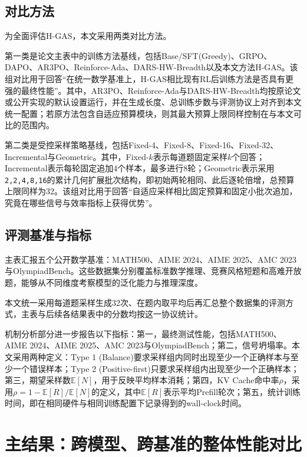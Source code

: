 \subsection{对比方法}
\label{subsec:exp_baselines}

为全面评估H-GAS，本文采用两类对比方法。

第一类是论文主表中的训练方法基线，包括Base/SFT(Greedy)、GRPO、DAPO、AR3PO、Reinforce-Ada、DARS-HW-Breadth以及本文方法H-GAS。该组对比用于回答“在统一数学基准上，H-GAS相比现有RL后训练方法是否具有更强的最终性能”。其中，AR3PO、Reinforce-Ada与DARS-HW-Breadth均按原论文或公开实现的默认设置运行，并在生成长度、总训练步数与评测协议上对齐到本文统一配置；若原方法包含自适应预算模块，则其最大预算上限同样控制在与本文可比的范围内。

第二类是受控采样策略基线，包括Fixed-4、Fixed-8、Fixed-16、Fixed-32、Incremental与Geometric。其中，Fixed-$k$表示每道题固定采样$k$个回答；Incremental表示每轮固定追加4个样本，最多进行8轮；Geometric表示采用\texttt{2,2,4,8,16}的累计几何扩展批次结构，即初始两轮相同、此后逐轮倍增，总预算上限同样为32。该组对比用于回答“自适应采样相比固定预算和固定小批次追加，究竟在哪些信号与效率指标上获得优势”。

\subsection{评测基准与指标}
\label{subsec:exp_metrics}

主表汇报五个公开数学基准：MATH500、AIME 2024、AIME 2025、AMC 2023与OlympiadBench。这些数据集分别覆盖标准数学推理、竞赛风格短题和高难开放题，能够从不同维度考察模型的泛化能力与推理深度。

本文统一采用每道题采样生成32次、在题内取平均后再汇总整个数据集的评测方式，主表与后续各结果表中的分数均按这一协议统计。

机制分析部分进一步报告以下指标：第一，最终测试性能，包括MATH500、AIME 2024、AIME 2025、AMC 2023与OlympiadBench；第二，信号坍塌率。本文采用两种定义：Type 1 (Balance)要求采样组内同时出现至少一个正确样本与至少一个错误样本；Type 2 (Positive-first)只要求采样组内出现至少一个正确样本；第三，期望采样数$\mathbb{E}[N]$，用于反映平均样本消耗；第四，KV Cache命中率$\rho$，采用$\rho = 1 - \mathbb{E}[R] / \mathbb{E}[N]$的定义，其中$\mathbb{E}[R]$表示平均Prefill轮次；第五，统计训练时间，即在相同硬件与相同训练配置下记录得到的wall-clock时间。

\section{主结果：跨模型、跨基准的整体性能对比}
\label{sec:exp_main_results}

